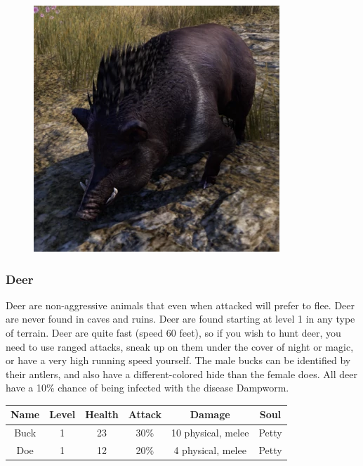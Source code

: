 \documentclass[12pt]{book}
\begin{document}
\begin{figure}[h]
	\centering
	\includegraphics[scale=1]{boar.png}
\end{figure}

\subsubsection{Deer}
Deer are non-aggressive animals that even when attacked will prefer to flee. Deer are never found in caves and ruins. Deer are found starting at level 1 in any type of terrain. Deer are quite fast (speed 60 feet), so if you wish to hunt deer, you need to use ranged attacks, sneak up on them under the cover of night or magic, or have a very high running speed yourself. The male bucks can be identified by their antlers, and also have a different-colored hide than the female does. All deer have a 10\% chance of being infected with the disease Dampworm.\\

\begin{tabular}{|c|c|c|c|c|c|}
\hline
Name & Level & Health & Attack & Damage & Soul\\ \hline
Buck & 1 & 23 & 30\% & 10 physical, melee & Petty\\ \hline
Doe & 1 & 12 & 20\% & 4 physical, melee & Petty\\ \hline
\end{tabular}\\
\end{document}
